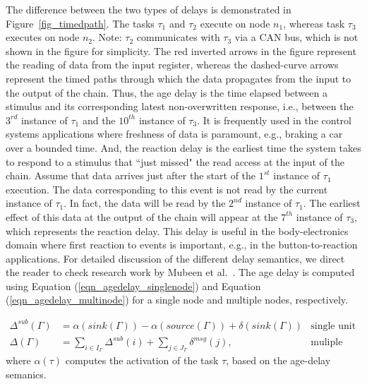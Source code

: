 {The difference between the two types of delays is demonstrated in Figure~\ref{fig_timedpath}. The tasks $\tau_1$ and $\tau_2$ execute on node $n_1$, whereas task $\tau_3$ executes on node $n_2$. Note: $\tau_2$ communicates with $\tau_3$ via a CAN bus, which is not shown in the figure for simplicity. The red inverted arrows in the figure represent the reading of data from the input register, whereas the dashed-curve arrows represent the timed paths through which the data propagates from the input to the output of the chain. Thus, the age delay is the time elapsed between a stimulus and its corresponding latest non-overwritten response, i.e., between the $3^{rd}$ instance of  $\tau_1$  and the $10^{th}$ instance of $\tau_3$. It is frequently used in the control systems applications where freshness of data is paramount, e.g., braking a car over a bounded time. And, the reaction delay is the earliest time the system takes to respond to a stimulus that ``just missed" the read access at the input of the chain. Assume that data arrives just after the start of the $1^{st}$ instance of $\tau_1$ execution. The data corresponding to this event is not read by the current instance of $\tau_1$. In fact, the data will be read by the $2^{nd}$ instance of $\tau_1$. The earliest effect of this data at the output of the chain will appear at the $7^{th}$ instance of $\tau_3$, which represents the reaction delay. This delay is useful in the body-electronics domain where first reaction to events is important, e.g., in the button-to-reaction applications. For detailed discussion of the different delay semantics, we direct the reader to check research work by Mubeen et al.~\cite{mubeen2013support}. The age delay is computed using Equation (\ref{eqn_agedelay_singlenode}) and Equation (\ref{eqn_agedelay_multinode}) for a single node and multiple nodes, respectively.

\begin{align}
	\label{eqn_agedelay_singlenode}
	\Delta^{sub}(\Gamma) &= \alpha(sink(\Gamma))-\alpha(source(\Gamma)) + \delta(sink(\Gamma)) & \text{single unit}\\
	\label{eqn_agedelay_multinode}
	\Delta(\Gamma)&=\sum_{i\in I_{\Gamma}}{\Delta^{sub}(i)} + \sum_{j\in  J_{\Gamma}}{\delta^{msg}(j)}, &\text{muliple units}
\end{align}
where $\alpha(\tau)$ computes the activation of the task $\tau$, based on the age-delay semanics.

}

